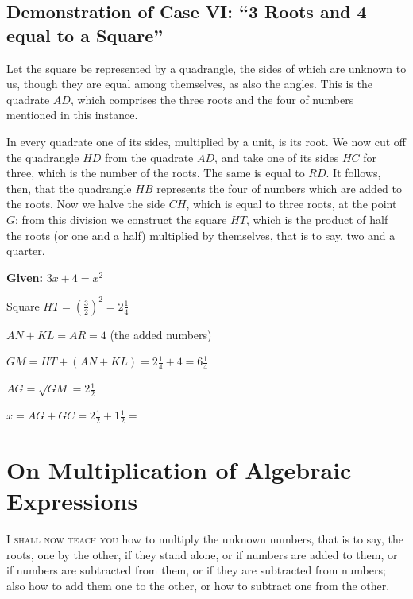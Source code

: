 \documentclass[11pt,a4paper,openany,oneside]{book}
\begin{document}
\section{Demonstration of Case VI: ``3 Roots and 4 equal to a Square''}

Let the square be represented by a quadrangle, the sides of which are unknown
to us, though they are equal among themselves, as also the angles. This is the
quadrate $AD$, which comprises the three roots and the four of numbers
mentioned in this instance.

In every quadrate one of its sides, multiplied by a unit, is its root. We now
cut off the quadrangle $HD$ from the quadrate $AD$, and take one of its sides
$HC$ for three, which is the number of the roots. The same is equal to $RD$.
It follows, then, that the quadrangle $HB$ represents the four of numbers
which are added to the roots. Now we halve the side $CH$, which is equal to
three roots, at the point $G$; from this division we construct the square
$HT$, which is the product of half the roots (or one and a half) multiplied
by themselves, that is to say, two and a quarter.

\begin{mathbox}[title={\textbf{Geometric Proof of Case VI}}]
\begin{center}
\textbf{Given:} $3x + 4 = x^2$

\vspace{0.3cm}

Square $HT = \left(\frac{3}{2}\right)^2 = 2\tfrac{1}{4}$

$AN + KL = AR = 4$ (the added numbers)

$GM = HT + (AN + KL) = 2\tfrac{1}{4} + 4 = 6\tfrac{1}{4}$

$AG = \sqrt{GM} = 2\tfrac{1}{2}$

$x = AG + GC = 2\tfrac{1}{2} + 1\tfrac{1}{2} =$ 
\end{center}
\end{mathbox}

\newpage

\chapter{On Multiplication of Algebraic Expressions}
\label{ch:multiplication}

\lettrine[lines=3, lhang=0.33, nindent=0em, findent=3pt]{
\textcolor{dropgold}{I}}{ shall now teach you} how to multiply the unknown numbers, that is to
say, the roots, one by the other, if they stand alone, or if numbers are
added to them, or if numbers are subtracted from them, or if they are
subtracted from numbers; also how to add them one to the other, or how to
subtract one from the other.
\end{document}
